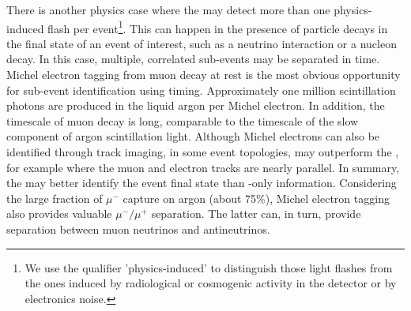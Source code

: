 There is another physics case where the  may detect more than one physics-induced flash per  event\footnote{We use the qualifier 'physics-induced' to distinguish those light flashes from the ones induced by radiological or cosmogenic activity in the detector or by electronics noise.}. This can happen in the presence of particle decays in the final state of an event of interest, such as a neutrino interaction or a nucleon decay. In this case, multiple, correlated sub-events may be separated in time. Michel electron tagging from muon decay at rest is the most obvious opportunity for sub-event identification using  timing. Approximately one million scintillation photons are produced in the liquid argon per Michel electron. In addition, the timescale of muon decay is long, comparable to the timescale of the slow component of argon scintillation light. Although Michel electrons can also be identified through  track imaging, in some event topologies,   may outperform the , for example where the muon and electron tracks are nearly parallel. In summary, the  may better identify the event final state than -only information. Considering the large fraction of $\mu^-$ capture on argon (about 75\%), Michel electron tagging also provides valuable $\mu^-/\mu^+$ separation. The latter can, in turn, provide separation between muon neutrinos and antineutrinos. 
